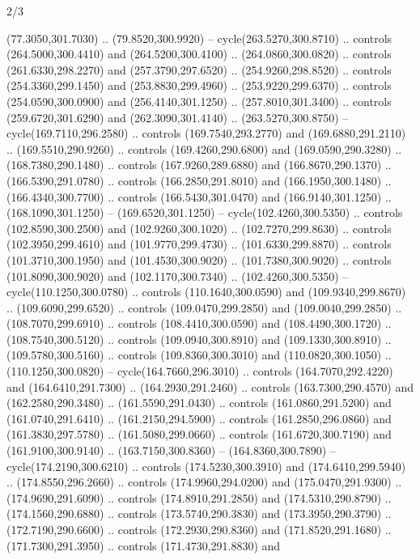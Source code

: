 \begin{flagdescription}{2/3}
\begin{scope}[xshift=0.5\flaglength,yshift=0.5\flagwidth,scale=\stretchfactor]
\begin{scope}[scale=0.001645\flagwidth,yshift=65mm,xshift=-63mm]
\begin{scope}[y=0.80pt, x=0.80pt, yscale=-1,]
\begin{scope}[cm={{1.33333,0.0,0.0,1.33333,(0.0,1e-05)}}]
  (77.3050,301.7030) .. (79.8520,300.9920) -- cycle(263.5270,300.8710) ..
  controls (264.5000,300.4410) and (264.5200,300.4100) .. (264.0860,300.0820) ..
  controls (261.6330,298.2270) and (257.3790,297.6520) .. (254.9260,298.8520) ..
  controls (254.3360,299.1450) and (253.8830,299.4960) .. (253.9220,299.6370) ..
  controls (254.0590,300.0900) and (256.4140,301.1250) .. (257.8010,301.3400) ..
  controls (259.6720,301.6290) and (262.3090,301.4140) .. (263.5270,300.8750) --
  cycle(169.7110,296.2580) .. controls (169.7540,293.2770) and
  (169.6880,291.2110) .. (169.5510,290.9260) .. controls (169.4260,290.6800) and
  (169.0590,290.3280) .. (168.7380,290.1480) .. controls (167.9260,289.6880) and
  (166.8670,290.1370) .. (166.5390,291.0780) .. controls (166.2850,291.8010) and
  (166.1950,300.1480) .. (166.4340,300.7700) .. controls (166.5430,301.0470) and
  (166.9140,301.1250) .. (168.1090,301.1250) -- (169.6520,301.1250) --
  cycle(102.4260,300.5350) .. controls (102.8590,300.2500) and
  (102.9260,300.1020) .. (102.7270,299.8630) .. controls (102.3950,299.4610) and
  (101.9770,299.4730) .. (101.6330,299.8870) .. controls (101.3710,300.1950) and
  (101.4530,300.9020) .. (101.7380,300.9020) .. controls (101.8090,300.9020) and
  (102.1170,300.7340) .. (102.4260,300.5350) -- cycle(110.1250,300.0780) ..
  controls (110.1640,300.0590) and (109.9340,299.8670) .. (109.6090,299.6520) ..
  controls (109.0470,299.2850) and (109.0040,299.2850) .. (108.7070,299.6910) ..
  controls (108.4410,300.0590) and (108.4490,300.1720) .. (108.7540,300.5120) ..
  controls (109.0940,300.8910) and (109.1330,300.8910) .. (109.5780,300.5160) ..
  controls (109.8360,300.3010) and (110.0820,300.1050) .. (110.1250,300.0820) --
  cycle(164.7660,296.3010) .. controls (164.7070,292.4220) and
  (164.6410,291.7300) .. (164.2930,291.2460) .. controls (163.7300,290.4570) and
  (162.2580,290.3480) .. (161.5590,291.0430) .. controls (161.0860,291.5200) and
  (161.0740,291.6410) .. (161.2150,294.5900) .. controls (161.2850,296.0860) and
  (161.3830,297.5780) .. (161.5080,299.0660) .. controls (161.6720,300.7190) and
  (161.9100,300.9140) .. (163.7150,300.8360) -- (164.8360,300.7890) --
  cycle(174.2190,300.6210) .. controls (174.5230,300.3910) and
  (174.6410,299.5940) .. (174.8550,296.2660) .. controls (174.9960,294.0200) and
  (175.0470,291.9300) .. (174.9690,291.6090) .. controls (174.8910,291.2850) and
  (174.5310,290.8790) .. (174.1560,290.6880) .. controls (173.5740,290.3830) and
  (173.3950,290.3790) .. (172.7190,290.6600) .. controls (172.2930,290.8360) and
  (171.8520,291.1680) .. (171.7300,291.3950) .. controls (171.4730,291.8830) and

\end{scope}
\end{scope}
\end{scope}
\end{scope}
\end{flagdescription}
